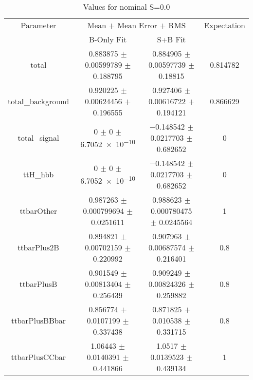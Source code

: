 \begin{table}
\centering
\caption{Values for nominal S=0.0}
\begin{tabular}{cccc}
\toprule
Parameter & \multicolumn{2}{c}{Mean $\pm$ Mean Error $\pm$ RMS} & Expectation\\
 & B-Only Fit & S+B Fit & \\
\midrule
total & \num{0.883875} $\pm$ \num{0.00599789} $\pm$ \num{0.188795} & \num{0.884905} $\pm$ \num{0.00597739} $\pm$ \num{0.18815} & \num{0.814782}\\
total\_background & \num{0.920225} $\pm$ \num{0.00624456} $\pm$ \num{0.196555} & \num{0.927406} $\pm$ \num{0.00616722} $\pm$ \num{0.194121} & \num{0.866629}\\
total\_signal & \num{0} $\pm$ \num{0} $\pm$ \num{6.7052e-10} & \num{-0.148542} $\pm$ \num{0.0217703} $\pm$ \num{0.682652} & \num{0}\\
ttH\_hbb & \num{0} $\pm$ \num{0} $\pm$ \num{6.7052e-10} & \num{-0.148542} $\pm$ \num{0.0217703} $\pm$ \num{0.682652} & \num{0}\\
ttbarOther & \num{0.987263} $\pm$ \num{0.000799694} $\pm$ \num{0.0251611} & \num{0.988623} $\pm$ \num{0.000780475} $\pm$ \num{0.0245564} & \num{1}\\
ttbarPlus2B & \num{0.894821} $\pm$ \num{0.00702159} $\pm$ \num{0.220992} & \num{0.907963} $\pm$ \num{0.00687574} $\pm$ \num{0.216401} & \num{0.8}\\
ttbarPlusB & \num{0.901549} $\pm$ \num{0.00813404} $\pm$ \num{0.256439} & \num{0.909249} $\pm$ \num{0.00824326} $\pm$ \num{0.259882} & \num{0.8}\\
ttbarPlusBBbar & \num{0.856774} $\pm$ \num{0.0107199} $\pm$ \num{0.337438} & \num{0.871825} $\pm$ \num{0.010538} $\pm$ \num{0.331715} & \num{0.8}\\
ttbarPlusCCbar & \num{1.06443} $\pm$ \num{0.0140391} $\pm$ \num{0.441866} & \num{1.0517} $\pm$ \num{0.0139523} $\pm$ \num{0.439134} & \num{1}\\
\bottomrule
\end{tabular}
\end{table}